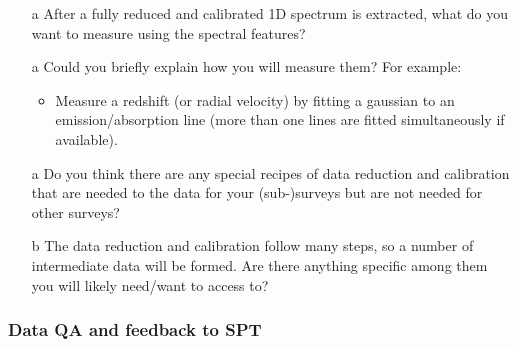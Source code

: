 \documentclass[a4paper,notitlepage]{article}
\begin{document}

\begin{enumerate}
 \item[a] After a fully reduced and calibrated 1D spectrum is extracted,
      what do you want to measure using the spectral features?
 \item[a] Could you briefly explain how you will measure them?
      For example:
      \begin{itemize}
       \item Measure a redshift (or radial velocity) by fitting a
         gaussian to an emission/absorption line (more than one
         lines are fitted simultaneously if available).
      \end{itemize}
 \item[a] Do you think there are any special recipes of data reduction
      and calibration that are needed to the data for your
      (sub-)surveys but are not needed for other surveys?
 \item[b] The data reduction and calibration follow many steps, so a
      number of intermediate data will be formed. Are there anything
      specific among them you will likely need/want to access to?
\end{enumerate}

\subsubsection{Data QA and feedback to SPT}
\end{document}
